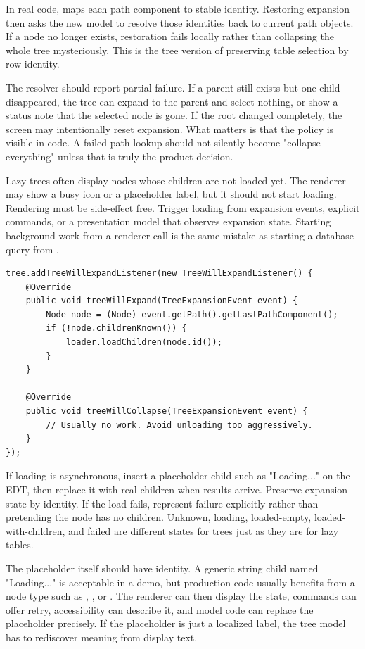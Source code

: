 In real code,  maps each path component to stable identity. Restoring expansion then asks the new model to resolve those identities back to current path objects. If a node no longer exists, restoration fails locally rather than collapsing the whole tree mysteriously. This is the tree version of preserving table selection by row identity.

The resolver should report partial failure. If a parent still exists but one child disappeared, the tree can expand to the parent and select nothing, or show a status note that the selected node is gone. If the root changed completely, the screen may intentionally reset expansion. What matters is that the policy is visible in code. A failed path lookup should not silently become "collapse everything" unless that is truly the product decision.

Lazy trees often display nodes whose children are not loaded yet. The renderer may show a busy icon or a placeholder label, but it should not start loading. Rendering must be side-effect free. Trigger loading from expansion events, explicit commands, or a presentation model that observes expansion state. Starting background work from a renderer call is the same mistake as starting a database query from .

\begin{lstlisting}[caption={Loading children when a node is expanded, not when it is rendered.}]
tree.addTreeWillExpandListener(new TreeWillExpandListener() {
    @Override
    public void treeWillExpand(TreeExpansionEvent event) {
        Node node = (Node) event.getPath().getLastPathComponent();
        if (!node.childrenKnown()) {
            loader.loadChildren(node.id());
        }
    }

    @Override
    public void treeWillCollapse(TreeExpansionEvent event) {
        // Usually no work. Avoid unloading too aggressively.
    }
});
\end{lstlisting}

If loading is asynchronous, insert a placeholder child such as "Loading..." on the EDT, then replace it with real children when results arrive. Preserve expansion state by identity. If the load fails, represent failure explicitly rather than pretending the node has no children. Unknown, loading, loaded-empty, loaded-with-children, and failed are different states for trees just as they are for lazy tables.

The placeholder itself should have identity. A generic string child named "Loading..." is acceptable in a demo, but production code usually benefits from a node type such as , , or . The renderer can then display the state, commands can offer retry, accessibility can describe it, and model code can replace the placeholder precisely. If the placeholder is just a localized label, the tree model has to rediscover meaning from display text.

